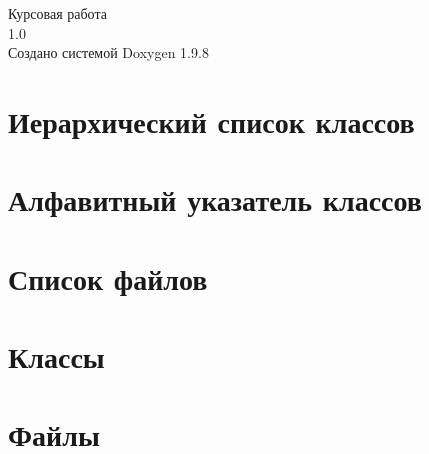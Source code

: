 \documentclass[twoside]{book}
\newcommand{\+}{\discretionary{\mbox{\scriptsize$\hookleftarrow$}}{}{}}
\newcommand{\clearemptydoublepage}{%
    \newpage{\pagestyle{empty}\cleardoublepage}%
  }
\begin{document}
  \raggedbottom
    \hypersetup{pageanchor=false,
                bookmarksnumbered=true,
                pdfencoding=unicode
               }
  \begin{titlepage}
  \vspace*{7cm}
  \begin{center}%
  {\Large Курсовая работа}\\
  [1ex]\large 1.\+0 \\
  \vspace*{1cm}
  {\large Создано системой Doxygen 1.9.8}\\
  \end{center}
  \end{titlepage}
  \clearemptydoublepage
  \tableofcontents
  \clearemptydoublepage
  \hypersetup{pageanchor=true}

\chapter{Иерархический список классов}

\chapter{Алфавитный указатель классов}

\chapter{Список файлов}

\chapter{Классы}








\chapter{Файлы}












  \backmatter
  \newpage
  \clearemptydoublepage
  \printindex
\end{document}
